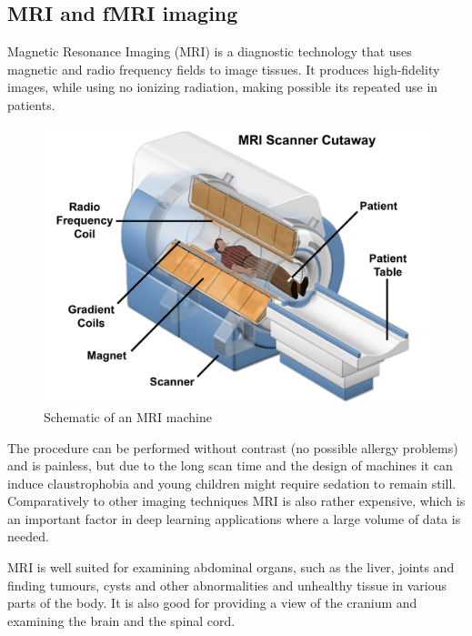 	
	
	
	\subsection{MRI and fMRI imaging}
	
	Magnetic Resonance Imaging (MRI) is a diagnostic technology that uses magnetic and radio frequency fields to image tissues\cite{atkins2002fully}. It produces high-fidelity images, while using no ionizing radiation, making possible its repeated use in patients. 
	
	\begin{figure}[!h]
		\centering
		\includegraphics[width=\textwidth]{figures/mri_scanner.png}
		\caption{Schematic of an MRI machine\cite{mripage}}
	\end{figure}
	
	The procedure can be performed without contrast (no possible allergy problems) and is painless, but due to the long scan time and the design of machines it can induce claustrophobia and young children might require sedation to remain still. Comparatively to other imaging techniques MRI is also rather expensive, which is an important factor in deep learning applications where a large volume of data is needed.
	
	MRI is well suited for examining abdominal organs, such as the liver, joints and finding tumours, cysts and other abnormalities and unhealthy tissue in various parts of the body. It is also good for providing a view of the cranium and examining the brain and the spinal cord.
	
